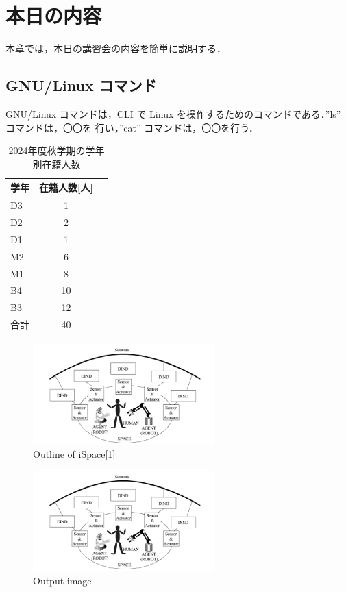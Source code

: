 \documentclass[11pt, a4paper]{jarticle}
\begin{document}
\section{本日の内容}
本章では，本日の講習会の内容を簡単に説明する．
\subsection{GNU/Linux コマンド}
GNU/Linux コマンドは，CLI で Linux を操作するためのコマンドである．”ls” コマンドは，〇〇を
行い，”cat” コマンドは，〇〇を行う．
\begin{table}[tb] %
	\caption{2024年度秋学期の学年別在籍人数}
	\label{table1}
	\begin{center}
	\begin{tabular}{| l | c | r |}
	\hline
	学年 & 在籍人数[人] \\ \hline
	D3 & 1  \\ \hline
    D2 & 2  \\ \hline
    D1 & 1  \\ \hline
    M2 & 6  \\ \hline
    M1 & 8  \\ \hline
    B4 & 10  \\ \hline
    B3 & 12  \\ \hline
    合計 & 40  \\ \hline
	\end{tabular}
	\end{center}
\end{table}

\begin{figure}[tb] %
	\begin{center}
	\includegraphics[width=70mm]{figure3.png}
	\caption{Outline of iSpace[1]}
	\label{figure1}
	\end{center}
\end{figure}

\begin{figure}[tb] %
	\begin{center}
	\includegraphics[width=70mm]{figure3.png}
	\caption{Output image}
	\label{figure2}
	\end{center}
\end{figure}
\end{document}
